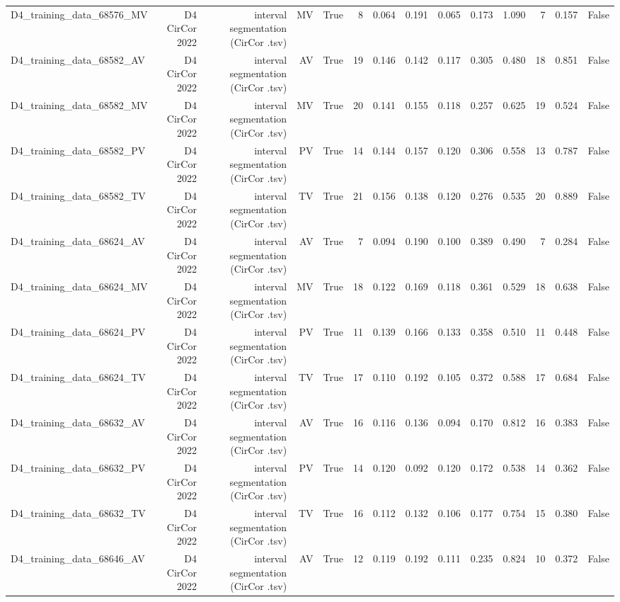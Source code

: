 \begin{table}[htbp]
\begin{tabular}{lrrrrrrrrrrrrr}
    D4\_training\_data\_68576\_MV & D4 CirCor 2022 & interval segmentation (CirCor .tsv) & MV & True & 8 & 0.064 & 0.191 & 0.065 & 0.173 & 1.090 & 7 & 0.157 & False \\
    D4\_training\_data\_68582\_AV & D4 CirCor 2022 & interval segmentation (CirCor .tsv) & AV & True & 19 & 0.146 & 0.142 & 0.117 & 0.305 & 0.480 & 18 & 0.851 & False \\
    D4\_training\_data\_68582\_MV & D4 CirCor 2022 & interval segmentation (CirCor .tsv) & MV & True & 20 & 0.141 & 0.155 & 0.118 & 0.257 & 0.625 & 19 & 0.524 & False \\
    D4\_training\_data\_68582\_PV & D4 CirCor 2022 & interval segmentation (CirCor .tsv) & PV & True & 14 & 0.144 & 0.157 & 0.120 & 0.306 & 0.558 & 13 & 0.787 & False \\
    D4\_training\_data\_68582\_TV & D4 CirCor 2022 & interval segmentation (CirCor .tsv) & TV & True & 21 & 0.156 & 0.138 & 0.120 & 0.276 & 0.535 & 20 & 0.889 & False \\
    D4\_training\_data\_68624\_AV & D4 CirCor 2022 & interval segmentation (CirCor .tsv) & AV & True & 7 & 0.094 & 0.190 & 0.100 & 0.389 & 0.490 & 7 & 0.284 & False \\
    D4\_training\_data\_68624\_MV & D4 CirCor 2022 & interval segmentation (CirCor .tsv) & MV & True & 18 & 0.122 & 0.169 & 0.118 & 0.361 & 0.529 & 18 & 0.638 & False \\
    D4\_training\_data\_68624\_PV & D4 CirCor 2022 & interval segmentation (CirCor .tsv) & PV & True & 11 & 0.139 & 0.166 & 0.133 & 0.358 & 0.510 & 11 & 0.448 & False \\
    D4\_training\_data\_68624\_TV & D4 CirCor 2022 & interval segmentation (CirCor .tsv) & TV & True & 17 & 0.110 & 0.192 & 0.105 & 0.372 & 0.588 & 17 & 0.684 & False \\
    D4\_training\_data\_68632\_AV & D4 CirCor 2022 & interval segmentation (CirCor .tsv) & AV & True & 16 & 0.116 & 0.136 & 0.094 & 0.170 & 0.812 & 16 & 0.383 & False \\
    D4\_training\_data\_68632\_PV & D4 CirCor 2022 & interval segmentation (CirCor .tsv) & PV & True & 14 & 0.120 & 0.092 & 0.120 & 0.172 & 0.538 & 14 & 0.362 & False \\
    D4\_training\_data\_68632\_TV & D4 CirCor 2022 & interval segmentation (CirCor .tsv) & TV & True & 16 & 0.112 & 0.132 & 0.106 & 0.177 & 0.754 & 15 & 0.380 & False \\
    D4\_training\_data\_68646\_AV & D4 CirCor 2022 & interval segmentation (CirCor .tsv) & AV & True & 12 & 0.119 & 0.192 & 0.111 & 0.235 & 0.824 & 10 & 0.372 & False \\

\end{tabular}
\end{table}
